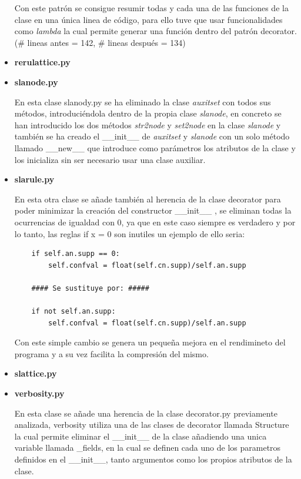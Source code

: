 \documentclass{cosas/tfg_domingo}
\begin{document}
\begin{itemize}
Con este patrón se consigue resumir todas y cada una de las funciones de la clase en una única linea de código, para ello tuve que usar funcionalidades como \textit{lambda} la cual permite generar una función dentro del patrón decorator. (\# lineas antes = 142, \# lineas después = 134)

\item \textbf{rerulattice.py}

\item \textbf{slanode.py}

En esta clase slanody.py se ha eliminado la clase \textit{auxitset} con todos sus métodos, introduciéndola dentro de la propia clase \textit{slanode}, en concreto se han introducido los dos métodos \textit{str2node} y \textit{set2node} en la clase \textit{slanode} y también se ha creado el \_\_init\_\_ de \textit{auxitset} y \textit{slanode} con un solo método llamado \_\_new\_\_ que introduce como parámetros los atributos de la clase y los inicializa sin ser necesario usar una clase auxiliar.

\item \textbf{slarule.py}

En esta otra clase se añade también al herencia de la clase decorator para poder minimizar la creación del constructor \_\_init\_\_ , se eliminan todas la ocurrencias de igualdad con 0, ya que en este caso siempre es verdadero y por lo tanto, las reglas if x = 0 son inutiles un ejemplo de ello seria:

\begin{verbatim}
    if self.an.supp == 0:
        self.confval = float(self.cn.supp)/self.an.supp
        
    #### Se sustituye por: #####
    
    if not self.an.supp:
        self.confval = float(self.cn.supp)/self.an.supp
\end{verbatim}

Con este simple cambio se genera un pequeña mejora en el rendimineto del programa y a su vez facilita la compresión del mismo.

\item \textbf{slattice.py}
    
\item \textbf{verbosity.py}

En esta clase se añade una herencia de la clase decorator.py previamente analizada, verbosity utiliza una de las clases de decorator llamada Structure la cual permite eliminar el \_\_init\_\_ de la clase añadiendo una unica variable llamada \_fields, en la cual se definen cada uno de los parametros definidos en el \_\_init\_\_, tanto argumentos como los propios atributos de la clase.


\end{itemize}
\end{document}
